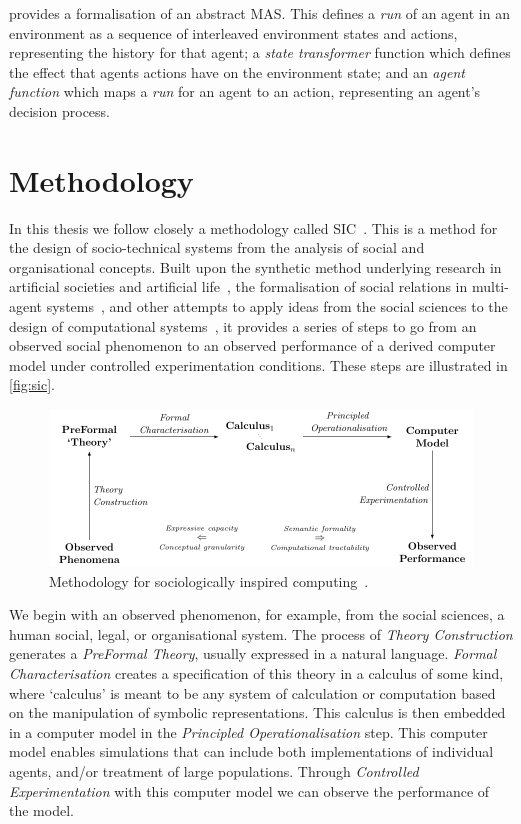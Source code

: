 \citet[pp.31--32]{Wooldridge2002} provides a formalisation of an abstract \ac{MAS}. This defines a \emph{run} of an agent in an environment as a sequence of interleaved environment states and actions, representing the history for that agent; a \emph{state transformer} function which defines the effect that agents actions have on the environment state; and an \emph{agent function} which maps a \emph{run} for an agent to an action, representing an agent's decision process.

\section{Methodology}

In this thesis we follow closely a methodology called \ac{SIC}~\citep{Jones2013}. This is a method for the design of socio-technical systems from the analysis of social and organisational concepts. Built upon the synthetic method underlying research in artificial societies and artificial life~\citep{Steels1994}, the formalisation of social relations in multi-agent systems~\citep{Neville2004}, and other attempts to apply ideas from the social sciences to the design of computational systems~\citep{Edmonds2005}, it provides a series of steps to go from an observed social phenomenon to an observed performance of a derived computer model under controlled experimentation conditions. These steps are illustrated in \autoref{fig:sic}.

\begin{figure}
\caption[Methodology for sociologically inspired computing.]{Methodology for sociologically inspired computing~\citep{Jones2013}.}\label{fig:sic}
\includegraphics[width=\linewidth]{gfx/sic}
\end{figure}

We begin with an observed phenomenon, for example, from the social sciences, a human social, legal, or organisational system. The process of \emph{Theory Construction} generates a \emph{PreFormal Theory}, usually expressed in a natural language. \emph{Formal Characterisation} creates a specification of this theory in a calculus of some kind, where `calculus' is meant to be any system of calculation or computation based on the manipulation of symbolic representations. This calculus is then embedded in a computer model in the \emph{Principled Operationalisation} step. This computer model enables simulations that can include both implementations of individual agents, and/or treatment of large populations. Through \emph{Controlled Experimentation} with this computer model we can observe the performance of the model.

